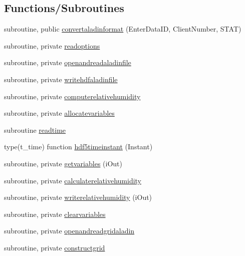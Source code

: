 \subsection*{Functions/\+Subroutines}
\begin{DoxyCompactItemize}
\item 
subroutine, public \mbox{\hyperlink{namespacemodulealadinformat_a77f6d15bb472ac521ff23ef7a54a48e7}{convertaladinformat}} (Enter\+Data\+ID, Client\+Number, S\+T\+AT)
\item 
subroutine, private \mbox{\hyperlink{namespacemodulealadinformat_aae35e2c47a633497f92dcf61c358e656}{readoptions}}
\item 
subroutine, private \mbox{\hyperlink{namespacemodulealadinformat_a0340c1a27e19b5142e4089d2951da7cb}{openandreadaladinfile}}
\item 
subroutine, private \mbox{\hyperlink{namespacemodulealadinformat_ad234b4831ac8d0d1f8ad444d37000469}{writehdfaladinfile}}
\item 
subroutine, private \mbox{\hyperlink{namespacemodulealadinformat_ae9288daa19c82d5cb2b9c128f3b55cbc}{computerelativehumidity}}
\item 
subroutine, private \mbox{\hyperlink{namespacemodulealadinformat_a5af9fedde7e74dd064c4bda092bbc671}{allocatevariables}}
\item 
subroutine \mbox{\hyperlink{namespacemodulealadinformat_a75d489bd9df9a1d8553c1154e13368f1}{readtime}}
\item 
type(t\+\_\+time) function \mbox{\hyperlink{namespacemodulealadinformat_a5841418d49ae6a17486590f8f686e489}{hdf5timeinstant}} (Instant)
\item 
subroutine, private \mbox{\hyperlink{namespacemodulealadinformat_ac871ced2e3713912a0c9a9563bbab1cb}{getvariables}} (i\+Out)
\item 
subroutine, private \mbox{\hyperlink{namespacemodulealadinformat_a1c17164c3687aa7b8257c842cf0ad32a}{calculaterelativehumidity}}
\item 
subroutine, private \mbox{\hyperlink{namespacemodulealadinformat_a2c5da57a26426886fbd2f4fbe4ce299c}{writerelativehumidity}} (i\+Out)
\item 
subroutine, private \mbox{\hyperlink{namespacemodulealadinformat_abe2227188275639d4c746fc709d090e2}{clearvariables}}
\item 
subroutine, private \mbox{\hyperlink{namespacemodulealadinformat_a4259301b2389ab6c64a24416eb73c157}{openandreadgridaladin}}
\item 
subroutine, private \mbox{\hyperlink{namespacemodulealadinformat_ab29f0499d468883233584caea8913297}{constructgrid}}

\end{DoxyCompactItemize}
